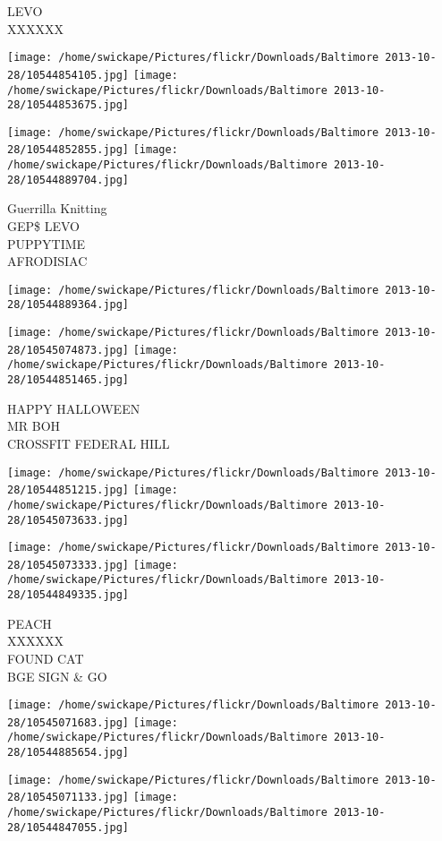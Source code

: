\documentclass[10pt,letterpaper]{article}
\begin{document}
LEVO\\
XXXXXX
\pagebreak

\texttt{[image: /home/swickape/Pictures/flickr/Downloads/Baltimore 2013-10-28/10544854105.jpg]}
\texttt{[image: /home/swickape/Pictures/flickr/Downloads/Baltimore 2013-10-28/10544853675.jpg]}

\texttt{[image: /home/swickape/Pictures/flickr/Downloads/Baltimore 2013-10-28/10544852855.jpg]}
\texttt{[image: /home/swickape/Pictures/flickr/Downloads/Baltimore 2013-10-28/10544889704.jpg]}

Guerrilla Knitting\\
GEP\$ LEVO\\
PUPPYTIME\\
AFRODISIAC
\pagebreak

\texttt{[image: /home/swickape/Pictures/flickr/Downloads/Baltimore 2013-10-28/10544889364.jpg]}

\vspace{0.25in}
\texttt{[image: /home/swickape/Pictures/flickr/Downloads/Baltimore 2013-10-28/10545074873.jpg]}
\texttt{[image: /home/swickape/Pictures/flickr/Downloads/Baltimore 2013-10-28/10544851465.jpg]}

HAPPY HALLOWEEN\\
MR BOH\\
CROSSFIT FEDERAL HILL
\pagebreak

\texttt{[image: /home/swickape/Pictures/flickr/Downloads/Baltimore 2013-10-28/10544851215.jpg]}
\texttt{[image: /home/swickape/Pictures/flickr/Downloads/Baltimore 2013-10-28/10545073633.jpg]}

\texttt{[image: /home/swickape/Pictures/flickr/Downloads/Baltimore 2013-10-28/10545073333.jpg]}
\texttt{[image: /home/swickape/Pictures/flickr/Downloads/Baltimore 2013-10-28/10544849335.jpg]}

PEACH\\
XXXXXX\\
FOUND CAT\\
BGE SIGN \& GO
\pagebreak

\texttt{[image: /home/swickape/Pictures/flickr/Downloads/Baltimore 2013-10-28/10545071683.jpg]}
\texttt{[image: /home/swickape/Pictures/flickr/Downloads/Baltimore 2013-10-28/10544885654.jpg]}

\texttt{[image: /home/swickape/Pictures/flickr/Downloads/Baltimore 2013-10-28/10545071133.jpg]}
\texttt{[image: /home/swickape/Pictures/flickr/Downloads/Baltimore 2013-10-28/10544847055.jpg]}
\end{document}
